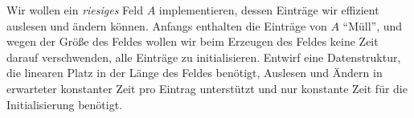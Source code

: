 \documentclass{uebung_cs}
\begin{document}
\begin{aufgabe}
	Wir wollen ein \textit{riesiges} Feld $A$ implementieren, dessen Einträge wir effizient auslesen und ändern können.
	Anfangs enthalten die Einträge von $A$ \enquote{Müll}, und wegen der Größe des Feldes wollen wir beim Erzeugen des Feldes keine Zeit darauf verschwenden, alle Einträge zu initialisieren.
	Entwirf eine Datenstruktur, die linearen Platz in der Länge des Feldes benötigt, Auslesen und Ändern in erwarteter konstanter Zeit pro Eintrag unterstützt und nur konstante Zeit für die Initialisierung benötigt.
\end{aufgabe}
\end{document}
